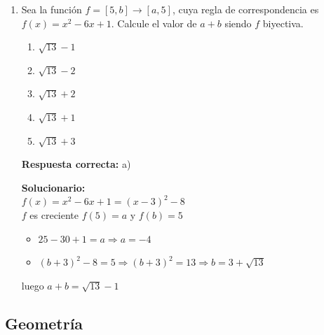 \begin{enumerate}[resume]
	
	\item Sea la función $f = [5,b] \to [a,5]$, cuya regla de correspondencia es $f(x)=x^2-6x+1$. Calcule el valor de $a+b$ siendo $f$ biyectiva. 
	\begin{enumerate}[label=\alph*)]
		\item $\sqrt{13}-1$
		\item $\sqrt{13}-2$
		\item $\sqrt{13}+2$
		\item $\sqrt{13}+1$
		\item $\sqrt{13}+3$
	\end{enumerate}
	
	\textbf{Respuesta correcta:} a)
	
	\vspace{2mm}
	\textbf{Solucionario:}\\
	
	$f(x)=x^2-6x+1=(x-3)^2-8$\\
	$f$ es creciente $f(5)=a$ y $f(b)=5$
	
	\begin{itemize}[label=.]
		\item $25 - 30 + 1 = a\Rightarrow a =  - 4$
		\item $(b + 3)^2 - 8 = 5 \Rightarrow {(b + 3)^2} = 13 \Rightarrow b = 3 + \sqrt {13}$
		
	\end{itemize}
	
	luego $a+b=\sqrt{13}-1$
	
\end{enumerate}



\subsection*{Geometría}

